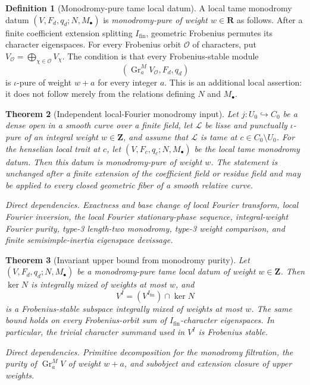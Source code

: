 \documentclass[10pt]{article}
\newtheorem{theorem}{Theorem}[section]
\theoremstyle{definition}
\newtheorem{definition}[theorem]{Definition}
\newcommand{\dep}[1]{\par\smallskip\noindent\textit{Direct dependencies.} #1\par}
\begin{document}
\begin{definition}[Monodromy-pure tame local datum]
A local tame monodromy datum
\((V,F_d,q_d;N,M_\bullet)\) is
\emph{monodromy-pure of weight \(w\in\mathbf R\)} as follows.  After a
finite coefficient extension splitting \(I_{\mathrm{fin}}\), geometric
Frobenius permutes its character eigenspaces.  For every Frobenius orbit
\(\mathcal O\) of characters, put
\(V_{\mathcal O}=\bigoplus_{\chi\in\mathcal O}V_\chi\).  The condition is
that every Frobenius-stable module
\[
 (\operatorname{Gr}_a^M V_{\mathcal O},F_d,q_d)
\]
is \(\iota\)-pure of weight \(w+a\) for every integer \(a\).
This is an additional local assertion: it does not follow merely from the
relations defining \(N\) and \(M_\bullet\).
\end{definition}

\begin{theorem}[Independent local-Fourier monodromy input]
Let \(j:U_0\hookrightarrow C_0\) be a dense open in a smooth curve over a
finite field, let \(\mathcal L\) be lisse and punctually
\(\iota\)-pure of an integral weight \(w\in\mathbf Z\), and assume that
\(\mathcal L\)
is tame at \(c\in C_0\setminus U_0\).  For the henselian local trait at
\(c\), let \((V,F_c,q_c;N,M_\bullet)\) be the local tame monodromy datum.
Then
this datum is monodromy-pure of weight \(w\).  The statement is unchanged
after a finite extension of the coefficient field or residue field and may
be applied to every closed geometric fiber of a smooth relative curve.
\dep{Exactness and base change of local Fourier transform, local Fourier
inversion, the local Fourier stationary-phase sequence, integral-weight
Fourier purity, type-3 length-two monodromy, type-3 weight comparison, and
finite semisimple-inertia eigenspace devissage.}
\end{theorem}

\begin{theorem}[Invariant upper bound from monodromy purity]
Let \((V,F_d,q_d;N,M_\bullet)\) be a monodromy-pure tame local datum of weight
\(w\in\mathbf Z\).  Then \(\ker N\) is integrally mixed of weights at
most \(w\), and
\[
                 V^I=(V^{I_{\mathrm{fin}}})\cap\ker N
\]
is a Frobenius-stable subspace integrally mixed of weights at most \(w\).
The same bound holds on every Frobenius-orbit sum of
\(I_{\mathrm{fin}}\)-character eigenspaces.  In particular, the trivial
character summand used in \(V^I\) is Frobenius stable.
\dep{Primitive decomposition for the monodromy filtration, the purity of
\(\operatorname{Gr}_a^M V\) of weight \(w+a\), and subobject and extension
closure of upper weights.}
\end{theorem}
\end{document}
